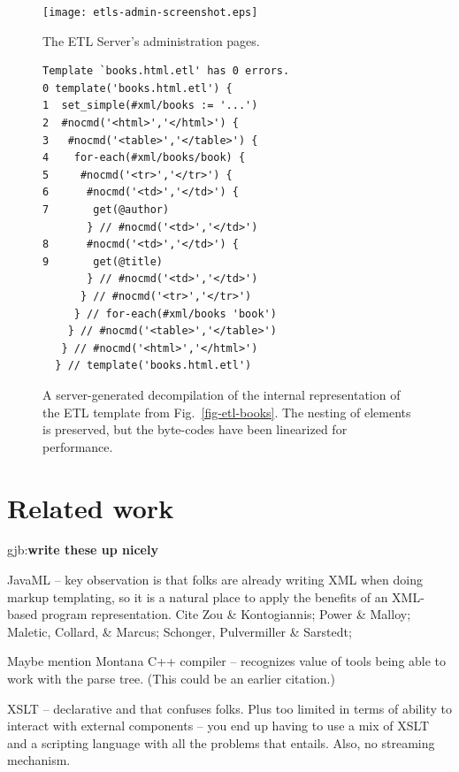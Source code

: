 \documentclass{www2003-submission}
\newcommand{\figref}[1]{Fig.~\ref{fig-#1}}
\newcommand{\gjb}[1]{{\sc gjb:}\textbf{#1}}
\begin{document}
\begin{figure}[tb]
\begin{centering}
\hspace*{-0.05\linewidth}\texttt{[image: etls-admin-screenshot.eps]}
\caption{The ETL Server's administration pages.
\label{fig-etls-admin}}
\end{centering}
\end{figure}



\begin{figure}[htbp]
\begin{verbatim}
Template `books.html.etl' has 0 errors.
0 template('books.html.etl') {
1  set_simple(#xml/books := '...')
2  #nocmd('<html>','</html>') {
3   #nocmd('<table>','</table>') {
4    for-each(#xml/books/book) {
5     #nocmd('<tr>','</tr>') {
6      #nocmd('<td>','</td>') {
7       get(@author)
       } // #nocmd('<td>','</td>')
8      #nocmd('<td>','</td>') {
9       get(@title)
       } // #nocmd('<td>','</td>')
      } // #nocmd('<tr>','</tr>')
     } // for-each(#xml/books 'book')
    } // #nocmd('<table>','</table>')
   } // #nocmd('<html>','</html>')
  } // template('books.html.etl')
\end{verbatim}
\caption{A server-generated decompilation of the internal representation
of the ETL template from \figref{etl-books}.  The nesting of elements
is preserved, but the byte-codes have been linearized for performance.
\label{fig-etl-decompile}}
\end{figure}


\section{Related work}
\label{sec-related-work}

\gjb{write these up nicely}

JavaML -- key observation is that folks are already writing XML when
doing markup templating, so it is a natural place to apply the
benefits of an XML-based program representation.  Cite Zou \&
Kontogiannis; Power \& Malloy; Maletic, Collard, \& Marcus; Schonger,
Pulvermiller \& Sarstedt; 

Maybe mention Montana C++ compiler -- recognizes value of tools being
able to work with the parse tree. (This could be an earlier citation.)

XSLT -- declarative and that confuses folks.  Plus too limited in
terms of ability to interact with external components -- you end up
having to use a mix of XSLT and a scripting language with all the
problems that entails.  Also, no streaming mechanism.
\end{document}
